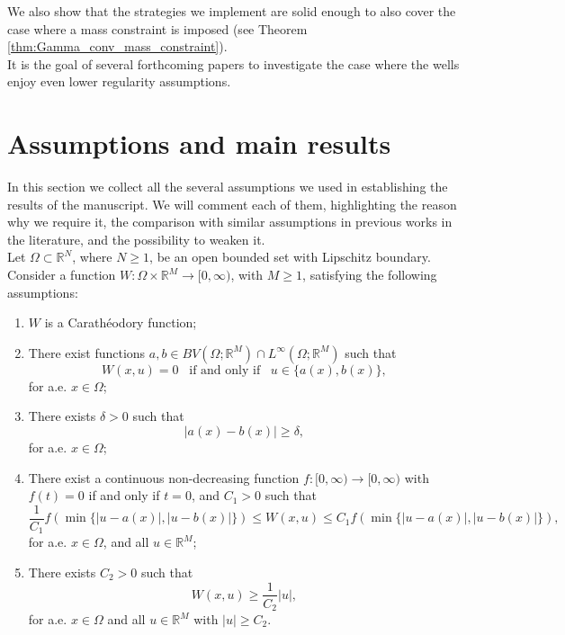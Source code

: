 \documentclass[a4paper, 11pt, reqno]{amsart}
\theoremstyle{plain}
\theoremstyle{definition}
\theoremstyle{remark}
\newcommand{\R}{\mathbb R}
\begin{document}
We also show that the strategies we implement are solid enough to also cover the case where a mass constraint is imposed (see Theorem \ref{thm:Gamma_conv_mass_constraint}).\\

It is the goal of several forthcoming papers to investigate the case where the wells enjoy even lower regularity assumptions.






\section{Assumptions and main results}

In this section we collect all the several assumptions we used in establishing the results of the manuscript.
We will comment each of them, highlighting the reason why we require it, the comparison with similar assumptions in previous works in the literature, and the possibility to weaken it.\\

Let $\Omega\subset\R^N$, where $N\geq 1$, be an open bounded set with Lipschitz boundary.
Consider a function $W \colon \Omega\times\R^M\to[0,\infty)$, with $M\geq 1$, satisfying the following assumptions:
 \begin{enumerate}[label=(H\arabic*), ref=(H\arabic*)]
            \item \label{H1} $W$ is a Carath\'{e}odory function;
            \item \label{H2} There exist functions $a,b\in BV(\Omega;\R^M)\cap L^\infty(\Omega;\R^M)$ such that
            \[
                W(x,u) = 0 \,\,\,\text{ if and only if }\,\,\, u\in\{a(x), b(x)\},
            \]
            for a.e. $x\in\Omega$;
            \item \label{H3} There exists $\delta>0$ such that
            \[
                |a(x) - b(x)| \geq \delta,
            \]
            for a.e. $x\in\Omega$;
            \item \label{H4} There exist a continuous non-decreasing function $f\colon[0,\infty)\to[0,\infty)$ with $f(t)=0$ if and only if $t=0$, and $C_1>0$ such that
            \[
            \frac{1}{C_1} f\left(\min\{ |u-a(x)|, |u-b(x)| \}\right)
            \leq W(x,u)
                \leq C_1 f\left(\min\{ |u-a(x)|, |u-b(x)| \}\right),
            \]
            for a.e. $x\in\Omega$, and all $u\in \R^M$;
            \item \label{H5} There exists $C_2>0$ such that
            \[
            W(x,u) \geq \frac{1}{C_2}|u|,
            \]
            for a.e. $x \in \Omega$ and all $u\in\R^M$ with $|u|\geq C_2$.\\
    \end{enumerate}
\end{document}
